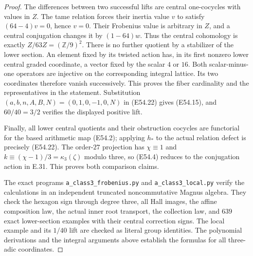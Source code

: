 \begin{proof}
The differences between two successful lifts are
central one-cocycles with values in $Z$.
The tame relation forces their inertia value $v$
to satisfy $(64-4)v=0$, hence $v=0$.
Their Frobenius value is arbitrary in $Z$, and
a central conjugation changes it by $(1-64)w$.
Thus the central cohomology is exactly
$Z/63Z=(\mathbb Z/9)^2$.
There is no further quotient by a stabilizer of
the lower section. An element fixed by its
twisted action has, in its first nonzero lower
central graded coordinate, a vector fixed by
the scalar $4$ or $16$. Both scalar-minus-one
operators are injective on the corresponding
integral lattice. Its two coordinates therefore
vanish successively. This proves the fiber
cardinality and the representatives in the statement.
Substitution $(a,b,n,A,B,N)=(0,1,0,-1,0,N)$
in (E54.22) gives (E54.15), and
$60/40=3/2$ verifies the displayed positive lift.

Finally, all lower central quotients and their
obstruction cocycles are functorial for the
based arithmetic map (E54.2); applying $h_*$
to the actual relation defect is precisely
(E54.22). The order-$27$ projection has
$\chi\equiv1$ and $k\equiv(\chi-1)/3
=\kappa_3(\zeta)$ modulo three, so (E54.4)
reduces to the conjugation action in E.31.
This proves both comparison claims.

The exact programs
\texttt{a\_class3\_frobenius.py} and
\texttt{a\_class3\_local.py} verify the calculations
in an independent truncated noncommutative Magnus
algebra. They check the hexagon sign through degree
three, all Hall images, the affine composition law,
the actual inner root transport, the collection
law, and $639$ exact lower-section examples with
their central correction signs. The local example
and its $1/40$ lift are checked as literal group
identities. The polynomial derivations and the
integral arguments above establish the formulas
for all three-adic coordinates.
\end{proof}
